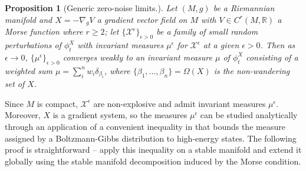 \documentclass[12pt]{article}
\newtheorem{proposition}[theorem]{Proposition}
\begin{document}
\begin{proposition}[Generic zero-noise limits.]
\label{proposition:zero-noise-limit-MS}
    Let $(M,g)$ be a Riemannian manifold and $X = -\nabla_g V$ a gradient vector field on $M$ with $V\in C^{r}(M,\mathbb{R})$ a Morse function where $r \geq 2$; let $\{\mathcal{X}^{\epsilon}\}_{\epsilon>0}$ be a family of small random perturbations of $\phi_t^X$ with invariant measures $\mu^{\epsilon}$ for $\mathcal{X^{\epsilon}}$ at a given $\epsilon>0$. Then as $\epsilon \rightarrow 0$, $\{\mu^{\epsilon}\}_{\epsilon>0}$ converges weakly to an invariant measure $\mu$ of $\phi_t^X$ consisting of a weighted sum $\mu=\sum_i^n w_i\delta_{\beta_i}$, where $\{ \beta_1,...,\beta_n \} = \Omega(X)$ is the non-wandering set of $X$.
\end{proposition}
Since $M$ is compact, $\mathcal{X}^{\epsilon}$ are non-explosive and admit invariant measures $\mu^{\epsilon}$. Moreover, $X$ is a gradient system, so the measures $\mu^{\epsilon}$ can be studied analytically through an application of a convenient inequality in \cite{hwang1980laplace} that bounds the measure assigned by a Boltzmann-Gibbs distribution to high-energy states. The following proof is straightforward -- apply this inequality on a stable manifold and extend it globally using the stable manifold decomposition induced by the Morse condition.
\vspace{0.5em}
\end{document}

